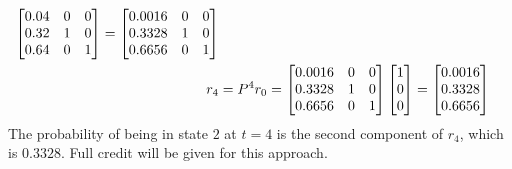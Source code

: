 \documentclass[a4paper]{article}
\begin{document}
\begin{solution}
\begin{itemize}
\begin{align*}
           \left[\begin{matrix} 0.04 & 0 & 0 \\ 0.32 & 1 & 0 \\ 0.64 & 0 & 1 \end{matrix}\right] 
         = \left[\begin{matrix} 0.0016 & 0 & 0 \\ 0.3328 & 1 & 0 \\ 0.6656 & 0 & 1 \end{matrix}\right] \\
    r_4 &= P^4r_0 
         = \left[\begin{matrix} 0.0016 & 0 & 0 \\ 0.3328 & 1 & 0 \\ 0.6656 & 0 & 1 \end{matrix}\right] 
           \left[\begin{matrix} 1 \\ 0 \\ 0 \end{matrix}\right] 
         = \left[\begin{matrix} 0.0016 \\ 0.3328 \\ 0.6656 \end{matrix}\right] 
   \end{align*}
   The probability of being in state $2$ at $t=4$ is the second
   component of $r_4$, which is $0.3328$.  Full credit will be given
   for this approach.


\end{itemize}
\end{solution}
\end{document}
